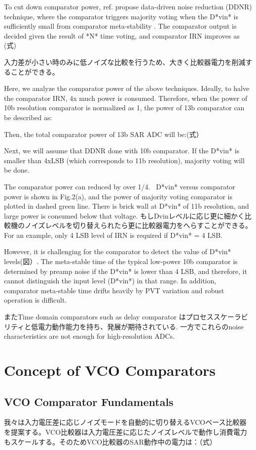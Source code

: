 \documentclass[letterpaper, 10 pt, conference]{ieeeconf}  %
\begin{document}
To cut down comparator power, ref.\cite{harpe201310b} propose data-driven noise reduction (DDNR) technique, where the comparator triggers majority voting when the D*vin* is sufficiently small from comparator meta-stability \cite{shikata20120}. The comparator output is decided given the result of *N* time voting, and comparator IRN improves as (式)

入力差が小さい時のみに低ノイズな比較を行うため、大きく比較器電力を削減することができる。

Here, we analyze the comparator power of the above techniques. Ideally, to halve the comparator IRN, 4x much power is consumed. Therefore, when the power of 10b resolution comparator is normalized as 1, the power of 13b comparator can be described as:

Then, the total comparator power of 13b SAR ADC will be:(式）

Next, we will assume that DDNR done with 10b comparator. If the D*vin* is smaller than 4xLSB (which corresponds to 11b resolution), majority voting will be done.

The comparator power can reduced by over 1/4.  D*vin* versus comparator power is shown in Fig.2(a), and the power of majority voting comparator is plotted in dashed green line. There is brick wall at D*vin* of 11b resolution, and large power is consumed below that voltage. もしDvinレベルに応じ更に細かく比較機のノイズレベルを切り替えられたら更に比較器電力をへらすことができる。For an example, only 4 LSB level of IRN is required if D*vin* = 4 LSB. 

However, it is challenging for the comparator to detect the value of D*vin* levels(図）. The meta-stable time of the typical low-power 10b comparator is determined by preamp noise if the D*vin* is lower than 4 LSB, and therefore, it cannot distinguish the input level (D*vin*) in that range. In addition, comparator meta-stable time drifts heavily by PVT variation and robust operation is difficult.

またTime domain comparators such as delay comparator \cite{agnes20089} はプロセススケーラビリティと低電力動作能力を持ち、発展が期待されている. 一方でこれらのnoise characteristics are not enough for high-resolution ADCs.

\section{Concept of VCO Comparators}
\subsection{VCO Comparator Fundamentals}
我々は入力電圧差に応じノイズモードを自動的に切り替えるVCOベース比較器を提案する\cite{yoshioka201413b}。VCO比較器は入力電圧差に応じたノイズレベルで動作し消費電力もスケールする。そのためVCO比較器のSAR動作中の電力は：（式）
\end{document}
